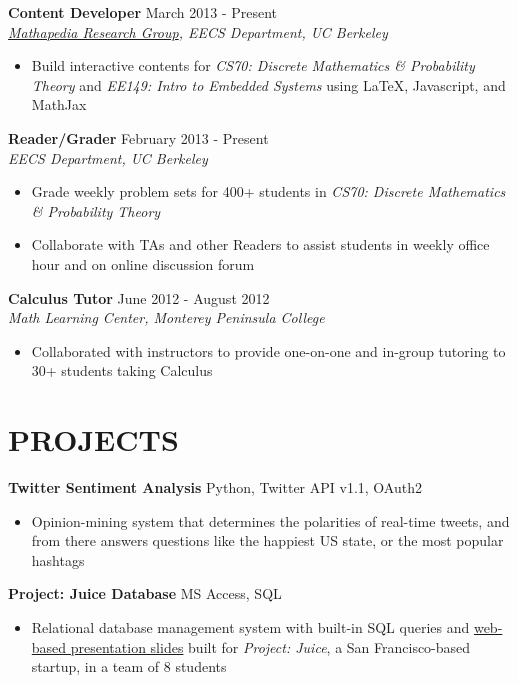 \documentclass[margin]{res}
\begin{document}
\begin{resume}
\textbf{Content Developer} \hfill March 2013 - Present \\
\textit{\href{https://mathapedia.com/}{Mathapedia Research Group}, EECS Department, UC Berkeley} \smallskip
\begin{itemize}[leftmargin=10pt]
\item Build interactive contents for \textit{CS70: Discrete Mathematics \& Probability Theory} and \textit{EE149: Intro to Embedded Systems} using \LaTeX{}, Javascript, and MathJax
\end{itemize}

\textbf{Reader/Grader} \hfill February 2013 - Present\\
\textit{EECS Department, UC Berkeley} \smallskip
\begin{itemize}[leftmargin=10pt]
\item Grade weekly problem sets for 400+ students in \textit{CS70: Discrete Mathematics \& Probability Theory}
\item Collaborate with TAs and other Readers to assist students in weekly office hour and on online discussion forum 
\end{itemize}

\textbf{Calculus Tutor} \hfill June 2012 - August 2012 \\
\textit{Math Learning Center, Monterey Peninsula College} \smallskip
\begin{itemize}[leftmargin=10pt]
\item Collaborated with instructors to provide one-on-one and in-group tutoring to 30+ students taking Calculus
\end{itemize}

\section{PROJECTS} 
\textbf{Twitter Sentiment Analysis} \hfill Python, Twitter API v1.1, OAuth2
\begin{itemize}[leftmargin=10pt]
\item Opinion-mining system that determines the polarities of real-time tweets, and from there answers questions like the happiest US state, or the most popular hashtags
\end{itemize}

\textbf{Project: Juice Database} \hfill MS Access, SQL
\begin{itemize}[leftmargin=10pt]
\item Relational database management system with built-in SQL queries and \href{http://kqdtran.github.io/course/ieor115/slide.html}{web-based presentation slides} built for \textit{Project: Juice}, a San Francisco-based startup, in a team of 8 students
\end{itemize}


\end{resume}
\end{document}
